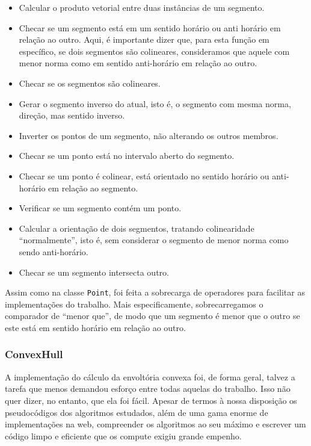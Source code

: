 \documentclass{article}
\begin{document}
\begin{itemize}
	\item Calcular o produto vetorial entre duas instâncias de um segmento.
	\item Checar se um segmento está em um sentido horário ou anti horário em relação ao outro. Aqui, é importante dizer que, para esta função em específico, se dois segmentos são colineares, consideramos que aquele com menor norma como em sentido anti-horário em relação ao outro.
	\item Checar se os segmentos são colineares.
	\item Gerar o segmento inverso do atual, isto é, o segmento com mesma norma, direção, mas sentido inverso.
	\item Inverter os pontos de um segmento, não alterando os outros membros.
	\item Checar se um ponto está no intervalo aberto do segmento.
	\item Checar se um ponto é colinear, está orientado no sentido horário ou anti-horário em relação ao segmento.
	\item Verificar se um segmento contém um ponto.
	\item Calcular a orientação de dois segmentos, tratando colinearidade ``normalmente'', isto é, sem considerar o segmento de menor norma como sendo anti-horário.
	\item Checar se um segmento intersecta outro.
\end{itemize}

Assim como na classe \texttt{Point}, foi feita a sobrecarga de operadores para facilitar as implementações do trabalho. Mais especificamente, sobrecarregamos o comparador de ``menor que'', de modo que um segmento é menor que o outro se este está em sentido horário em relação ao outro.

\subsubsection{ConvexHull}

A implementação do cálculo da envoltória convexa foi, de forma geral, talvez a tarefa que menos demandou esforço entre todas aquelas do trabalho. Isso não quer dizer, no entanto, que ela foi fácil. Apesar de termos à nossa disposição os pseudocódigos dos algoritmos estudados, além de uma gama enorme de implementações na web, compreender os algoritmos ao seu máximo e escrever um código limpo e eficiente que os compute exigiu grande empenho.
\end{document}
